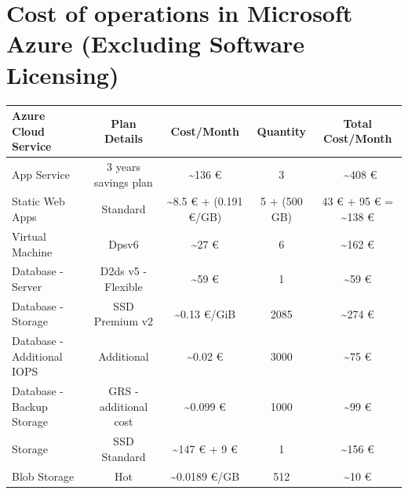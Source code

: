\documentclass{llncs}
\begin{document}
\section{Cost of operations in Microsoft Azure (Excluding Software Licensing) \cite{azure-pricing-calculator}}
\begin{table}[htbp]
    \centering
    \begin{tabular}{|l|c|c|c|c|}
        \hline
        \textbf{Azure Cloud Service} & \textbf{Plan Details} & \textbf{Cost/Month}                  & \textbf{Quantity} & \textbf{Total Cost/Month}           \\

        \hline
        App Service                  & 3 years savings plan  & \textasciitilde 136 €                & 3                 & ~\textasciitilde 408 €              \\
        \hline
        Static Web Apps              & Standard              & \textasciitilde 8.5 € + (0.191 €/GB) & 5 + (500 GB)      & 43 € + 95 € = \textasciitilde 138 € \\
        \hline
        Virtual Machine              & Dpsv6                 & \textasciitilde 27 €                 & 6                 & \textasciitilde 162 €               \\
        \hline
        Database - Server            & D2ds v5 - Flexible    & \textasciitilde 59 €                 & 1                 & \textasciitilde 59 €                \\
        \hline
        Database - Storage           & SSD Premium v2        & \textasciitilde 0.13 €/GiB           & 2085              & \textasciitilde 274 €               \\
        \hline
        Database - Additional IOPS   & Additional            & \textasciitilde 0.02 €               & 3000              & \textasciitilde 75 €                \\
        \hline
        Database - Backup Storage    & GRS - additional cost & \textasciitilde 0.099 €              & 1000              & \textasciitilde 99 €                \\
        \hline
        Storage                      & SSD Standard          & \textasciitilde 147 € + 9 €          & 1                 & \textasciitilde 156 €               \\
        \hline
        Blob Storage                 & Hot                   & \textasciitilde 0.0189 €/GB          & 512               & \textasciitilde 10 €                \\

\end{tabular}
\end{table}
\end{document}
